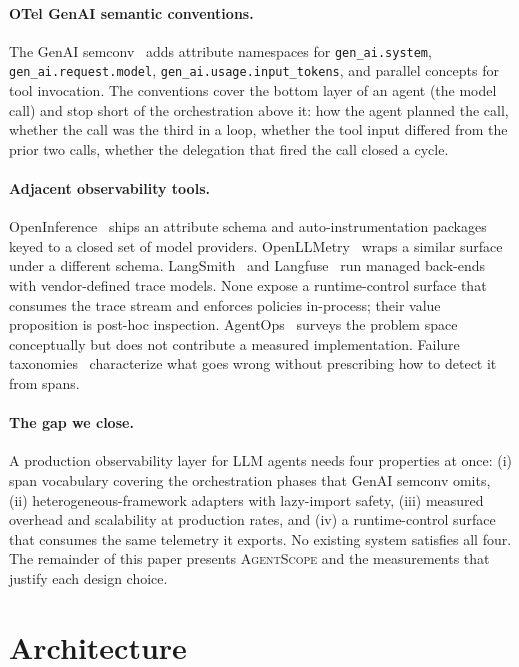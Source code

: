 \documentclass[sigplan,10pt,anonymous,review]{acmart}
\newcommand{\sysname}{\textsc{AgentScope}\xspace}
\begin{document}
\paragraph{OTel GenAI semantic conventions.} The GenAI
semconv~\cite{otel_genai} adds attribute namespaces for
\texttt{gen\_ai.system}, \texttt{gen\_ai.request.model},
\texttt{gen\_ai.usage.input\_tokens}, and parallel concepts for tool
invocation. The conventions cover the bottom layer of an agent (the
model call) and stop short of the orchestration above it: how the agent
planned the call, whether the call was the third in a loop, whether the
tool input differed from the prior two calls, whether the delegation
that fired the call closed a cycle.

\paragraph{Adjacent observability tools.}
OpenInference~\cite{openinference} ships an attribute schema and
auto-instrumentation packages keyed to a closed set of model providers.
OpenLLMetry~\cite{openllmetry} wraps a similar surface under a different
schema. LangSmith~\cite{langsmith} and Langfuse~\cite{langfuse} run
managed back-ends with vendor-defined trace models. None expose a
runtime-control surface that consumes the trace stream and enforces
policies in-process; their value proposition is post-hoc inspection.
AgentOps~\cite{agentops} surveys the problem space conceptually but
does not contribute a measured implementation. Failure
taxonomies~\cite{mast,agentdebug,aegis} characterize what goes wrong
without prescribing how to detect it from spans.

\paragraph{The gap we close.} A production observability layer for LLM
agents needs four properties at once: (i) span vocabulary covering the
orchestration phases that GenAI semconv omits, (ii) heterogeneous-framework
adapters with lazy-import safety, (iii) measured overhead and
scalability at production rates, and (iv) a runtime-control surface that
consumes the same telemetry it exports. No existing system satisfies
all four. The remainder of this paper presents \sysname and the
measurements that justify each design choice.

\section{Architecture}
\label{sec:arch}
\end{document}
